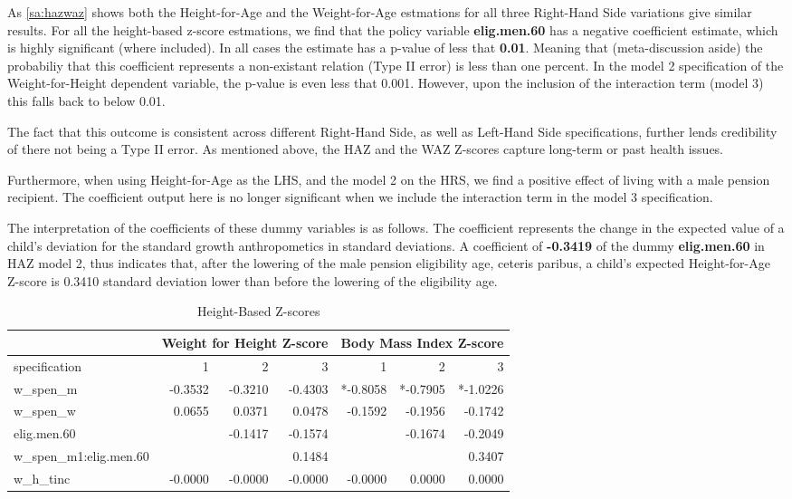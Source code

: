 \begin{refsection}
As \autoref{sa:hazwaz} shows both the Height-for-Age and the Weight-for-Age estmations for all three Right-Hand Side variations give similar results.
For all the height-based z-score estmations, we find that the policy variable \textbf{elig.men.60} has a negative coefficient estimate, which is highly significant (where included).
In all cases the estimate has a p-value of less that \textbf{0.01}.
Meaning that (meta-discussion aside) the probabiliy that this coefficient represents a non-existant relation (Type II error) is less than one percent.
In the model 2 specification of the Weight-for-Height dependent variable, the p-value is even less that 0.001.
However, upon the inclusion of the interaction term (model 3) this falls back to below 0.01.

The fact that this outcome is consistent across different Right-Hand Side,
as well as Left-Hand Side specifications, further lends credibility of there not being a Type II error.
As mentioned above, the HAZ and the WAZ Z-scores capture long-term or past health issues.

Furthermore, when using Height-for-Age as the LHS, and the model 2 on the HRS, we find a positive effect of living with a male pension recipient.
The coefficient output here is no longer significant when we include the interaction term in the model 3 specification.

The interpretation of the coefficients of these dummy variables is as follows.
The coefficient represents the change in the expected value of a child's deviation for the standard growth anthropometics in standard deviations. 
A coefficient of \textbf{-0.3419} of the dummy \textbf{elig.men.60} in HAZ model 2,  thus indicates that,
after the lowering of the male pension eligibility age, ceteris paribus, a child's expected Height-for-Age Z-score is 0.3410 standard deviation lower than before the lowering of the eligibility age.


\begin{table}[!ht]
\centering
\caption{Height-Based Z-scores}
\label{sa:whzbmiz}
\begin{tabular}{l|rrr|rrr}
& \multicolumn{3}{c}{Weight for Height Z-score} & \multicolumn{3}{c}{Body Mass Index Z-score}\\
\hline
specification & 1 & 2 & 3 & 1 & 2 & 3 \\
\hline
w\_spen\_m &  -0.3532 & -0.3210 & -0.4303 & *-0.8058 & *-0.7905 & *-1.0226 \\
w\_spen\_w & 0.0655 & 0.0371 & 0.0478 & -0.1592 & -0.1956 & -0.1742 \\
elig.men.60 & & -0.1417 & -0.1574 & & -0.1674 & -0.2049 \\
w\_spen\_m1:elig.men.60 & & & 0.1484 & & & 0.3407 \\
w\_h\_tinc & -0.0000 & -0.0000 & -0.0000 & -0.0000 & 0.0000 & 0.0000
\end{tabular}
\end{table}



\end{refsection}
